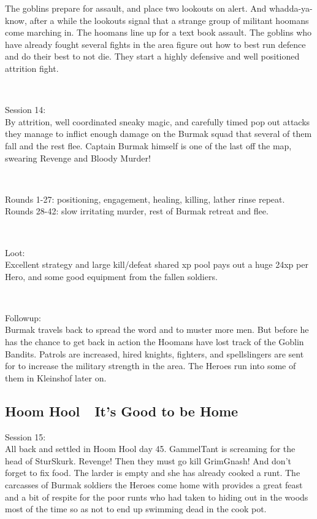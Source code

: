 The goblins prepare for assault, and place two lookouts on alert. And whadda-ya-know, after a while the lookouts signal that a strange group of militant hoomans come marching in. The hoomans line up for a text book assault. The goblins who have already fought several fights in the area figure out how to best run defence and do their best to not die. They start a highly defensive and well positioned attrition fight.

\

Session 14:\\                                                           %
By attrition, well coordinated sneaky magic, and carefully timed pop out attacks they manage to inflict enough damage on the Burmak squad that several of them fall and the rest flee. Captain Burmak himself is one of the last off the map, swearing Revenge and Bloody Murder!

\

Rounds 1-27: positioning, engagement, healing, killing, lather rinse repeat.  %
Rounds 28-42: slow irritating murder, rest of Burmak retreat and flee.        %

\

Loot:\\
Excellent strategy and large kill/defeat shared xp pool pays out a huge 24xp per Hero, and some good equipment from the fallen soldiers.

\

Followup:\\
Burmak travels back to spread the word and to muster more men. But before he has the chance to get back in action the Hoomans have lost track of the Goblin Bandits. Patrols are increased, hired knights, fighters, and spellslingers are sent for to increase the military strength in the area. The Heroes run into some of them in Kleinshof later on.




\subsection*{Hoom Hool~\mdash~It's Good to be Home}

\forceindent Session 15:\\                                              %
All back and settled in Hoom Hool day 45. GammelTant is screaming for the head of SturSkurk. Revenge! Then they must go kill GrimGnash! And don't forget to fix food. The larder is empty and she has already cooked a runt.
The carcasses of Burmak soldiers the Heroes come home with provides a great feast and a bit of respite for the poor runts who had taken to hiding out in the woods most of the time so as not to end up swimming dead in the cook pot.

